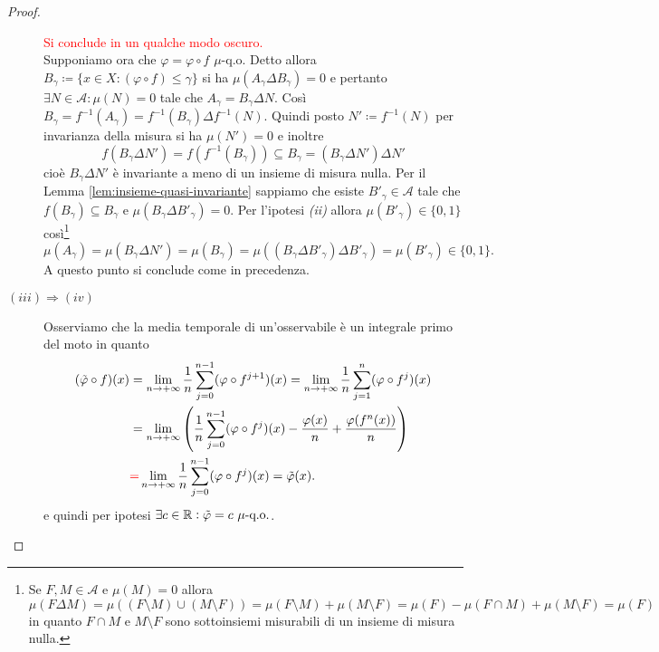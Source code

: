 \begin{proof}
\begin{description}
\[        \]
        \textcolor{red}{Si conclude in un qualche modo oscuro.}\\
        Supponiamo ora che $ \varphi = \varphi \circ f $ $ \mu $-q.o. Detto allora $ B_\gamma \coloneqq \{x \in X : (\varphi \circ f) \leq \gamma\} $ si ha $ \mu(A_\gamma \Delta B_\gamma) = 0 $ e pertanto $ \exists N \in \mathcal{A} : \mu(N) = 0 $ tale che $ A_\gamma = B_\gamma \Delta N $. Così $ B_\gamma = f^{-1}(A_\gamma) = f^{-1}(B_\gamma) \Delta f^{-1}(N) $. Quindi posto $ N' \coloneqq f^{-1}(N) $ per invarianza della misura si ha $ \mu(N') = 0 $ e inoltre
        \[
            f(B_\gamma \Delta N') = f(f^{-1}(B_\gamma)) \subseteq B_\gamma = (B_\gamma \Delta N') \Delta N'
        \]
        cioè $ B_\gamma \Delta N' $ è invariante a meno di un insieme di misura nulla. Per il Lemma \ref{lem:insieme-quasi-invariante} sappiamo che esiste $ B'_\gamma \in \mathcal{A} $ tale che $ f(B_\gamma) \subseteq B_\gamma $ e $ \mu(B_\gamma \Delta B'_\gamma) = 0 $. Per l'ipotesi \emph{(ii)} allora $ \mu(B'_\gamma) \in \{0, 1\} $ così\footnote{Se $ F, M \in \mathcal{A} $ e $ \mu(M) = 0 $ allora \[\mu(F \Delta M) = \mu((F \setminus M) \cup (M \setminus F)) = \mu(F \setminus M) + \mu(M \setminus F) = \mu(F) - \mu(F \cap M) + \mu(M \setminus F) = \mu(F)\] in quanto $ F \cap M $ e $ M \setminus F $ sono sottoinsiemi misurabili di un insieme di misura nulla.}
        \[
            \mu(A_\gamma) = \mu(B_\gamma \Delta N') = \mu(B_\gamma) = \mu((B_\gamma \Delta B'_\gamma) \Delta B'_\gamma) = \mu(B'_\gamma) \in \{0, 1\}.
        \]
        A questo punto si conclude come in precedenza.
        \item[$ (iii) \Rightarrow (iv) $] Osserviamo che la media temporale di un'osservabile è un integrale primo del moto in quanto
        \begin{align*}
            (\tilde{\varphi} \circ f)(x) & = \lim_{n \to +\infty} \frac{1}{n} \sum_{j = 0}^{n-1} (\varphi \circ f^{j+1})(x) = \lim_{n \to +\infty} \frac{1}{n} \sum_{j = 1}^{n} (\varphi \circ f^{j})(x) \\
            & = \lim_{n \to +\infty} \left(\frac{1}{n} \sum_{j = 0}^{n-1} (\varphi \circ f^{j})(x) - \frac{\varphi(x)}{n} + \frac{\varphi(f^{n}(x))}{n}\right) \\
            & \textcolor{red}{=} \lim_{n \to +\infty} \frac{1}{n} \sum_{j = 0}^{n-1} (\varphi \circ f^{j})(x) = \tilde{\varphi}(x).
        \end{align*}
        e quindi per ipotesi $ \exists c \in \R : \tilde{\varphi} = c \ \mu\text{-q.o.} $. \\

\end{description}
\end{proof}
